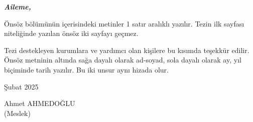 \documentclass[a4paper,oneside,12pt]{report}
\begin{document}
\clearpage

\begin{flushright}
	\vspace*{\fill}
	\textbf{\textit{Aileme,}} %
	\vspace*{\fill}
\end{flushright}

\begin{acknowledgements}
Önsöz bölümünün içerisindeki metinler 1 satır aralıklı yazılır. Tezin ilk sayfası
niteliğinde yazılan önsöz iki sayfayı geçmez.

Tezi destekleyen kurumlara ve yardımcı olan kişilere bu kısımda teşekkür edilir.
Önsöz metninin altında sağa dayalı olarak ad-soyad, sola dayalı olarak ay, yıl
biçiminde tarih yazılır. Bu iki unsur aynı hizada olur.
\vskip 36pt

\begin{minipage}{0.5\textwidth}
	\raggedright
	Şubat 2025
\end{minipage}%
\begin{minipage}{0.5\textwidth}
	\raggedleft
	Ahmet AHMEDOĞLU \\[2pt]
	{(Meslek)}
\end{minipage}

\end{acknowledgements}

\tableofcontents

\begin{abbreviations}
\end{abbreviations}

\begin{symbols}
\end{symbols}
\end{document}
